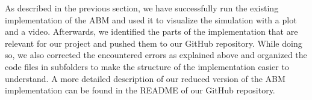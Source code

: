 As described in the previous section, we have successfully run the existing implementation of the ABM and used it to visualize the simulation with a plot and a video. Afterwards, we identified the parts of the implementation that are relevant for our project and pushed them to our GitHub repository. While doing so, we also corrected the encountered errors as explained above and organized the code files in subfolders to make the structure of the implementation easier to understand. A more detailed description of our reduced version of the ABM implementation can be found in the README of our GitHub repository.